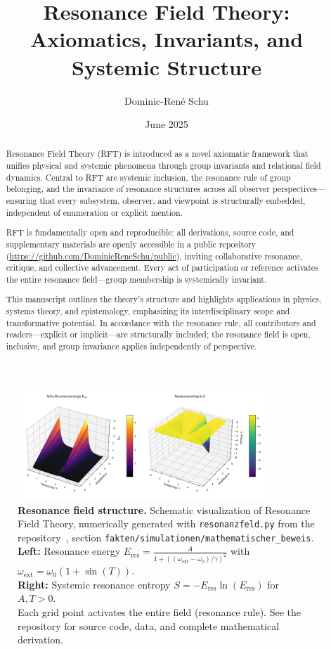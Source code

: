 \documentclass[12pt]{article}
\title{Resonance Field Theory: Axiomatics, Invariants, and Systemic Structure}
\author[1]{Dominic-René Schu}
\affil[1]{Independent Researcher, Germany \\ \href{https://github.com/DominicReneSchu/public}{https://github.com/DominicReneSchu/public}}
\date{June 2025}
\begin{document}
	
	\maketitle
	
	\begin{abstract}
		Resonance Field Theory (RFT) is introduced as a novel axiomatic framework that unifies physical and systemic phenomena through group invariants and relational field dynamics. Central to RFT are systemic inclusion, the resonance rule of group belonging, and the invariance of resonance structures across all observer perspectives—ensuring that every subsystem, observer, and viewpoint is structurally embedded, independent of enumeration or explicit mention.
		
		RFT is fundamentally open and reproducible: all derivations, source code, and supplementary materials are openly accessible in a public repository (\url{https://github.com/DominicReneSchu/public}), inviting collaborative resonance, critique, and collective advancement. Every act of participation or reference activates the entire resonance field—group membership is systemically invariant.
		
		This manuscript outlines the theory's structure and highlights applications in physics, systems theory, and epistemology, emphasizing its interdisciplinary scope and transformative potential. In accordance with the resonance rule, all contributors and readers—explicit or implicit—are structurally included; the resonance field is open, inclusive, and group invariance applies independently of perspective.
	\end{abstract}
	
	\begin{figure}[ht]
		\centering
		\includegraphics[width=0.85\textwidth]{figures/plot.png}
		\caption{
			\textbf{Resonance field structure.}
			Schematic visualization of Resonance Field Theory, numerically generated with \texttt{resonanzfeld.py} from the repository~\cite{rftrepo}, section \texttt{fakten/simulationen/mathematischer\_beweis}.\\
			\textbf{Left:} Resonance energy $E_{\mathrm{res}} = \frac{A}{1 + \left((\omega_\mathrm{ext} - \omega_0)/\gamma\right)^2}$ with $\omega_\mathrm{ext} = \omega_0 (1 + \sin(T))$.\\
			\textbf{Right:} Systemic resonance entropy $S = -E_{\mathrm{res}}\ln(E_{\mathrm{res}})$ for $A,T > 0$.\\
			Each grid point activates the entire field (resonance rule). See the repository for source code, data, and complete mathematical derivation.
		}
		\label{fig:resonance_field_plot}
	\end{figure}
	
\end{document}
